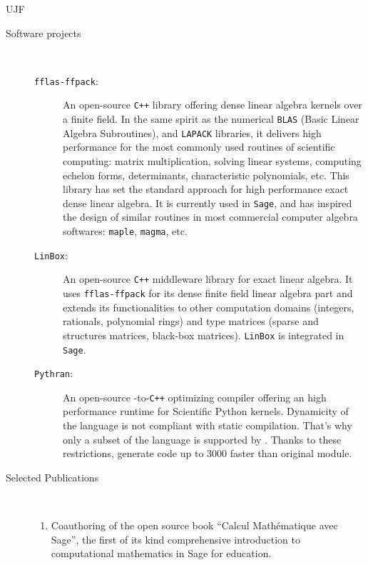 \begin{sitedescription}{UJF}
\begin{description}
\item[Software projects]\
  \begin{description}
 \item[\texttt{fflas-ffpack}:] An open-source \texttt{C++} library offering dense
    linear algebra kernels over a finite field. In the same  spirit as the
    numerical \texttt{BLAS} (Basic Linear Algebra Subroutines), and
    \texttt{LAPACK} libraries, it delivers high performance for the most
    commonly used routines of scientific computing: matrix multiplication,
    solving linear systems, computing echelon forms, determinants,
    characteristic polynomials, etc. This library has set the standard
    approach for high performance exact dense linear algebra. It is currently
    used in \texttt{Sage}, and has inspired the design of similar routines in
    most commercial computer algebra softwares: \texttt{maple}, \texttt{magma}, etc.
  \item[\texttt{LinBox}:] An open-source \texttt{C++} middleware library for
    exact linear algebra. It uses \texttt{fflas-ffpack} for its dense finite
    field linear algebra part and extends its functionalities to other
    computation domains (integers, rationals, polynomial rings) and type
    matrices (sparse and structures matrices, black-box
    matrices). \texttt{LinBox} is integrated in \texttt{Sage}. 
  \item[\texttt{Pythran}:] An open-source \Python-to-\texttt{C++} optimizing compiler
    offering an high performance runtime for Scientific Python kernels. Dynamicity of
    the \Python language is not compliant with static compilation. That's why only
    a subset of the \Python language is supported by \Pythran. Thanks to these
    restrictions, \Pythran generate code up to 3000 faster than original module.
  \end{description}
\item[Selected Publications]\ 
\medskip\noindent
\begin{enumerate}[1.]
\item Coauthoring of the open source book ``Calcul Mathématique avec
  Sage'', the first of its kind comprehensive introduction to
  computational mathematics in Sage for education.


\end{enumerate}
\end{description}
\end{sitedescription}
